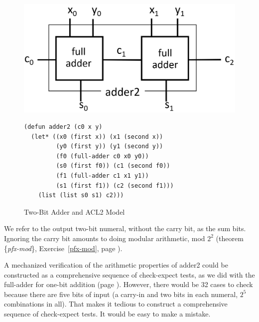 \begin{figure}
\begin{center}
\includegraphics[scale=0.25]{Images/adder2.png}
\begin{Verbatim}
(defun adder2 (c0 x y)
  (let* ((x0 (first x)) (x1 (second x))
         (y0 (first y)) (y1 (second y))
         (f0 (full-adder c0 x0 y0))
         (s0 (first f0)) (c1 (second f0))
         (f1 (full-adder c1 x1 y1))
         (s1 (first f1)) (c2 (second f1)))
    (list (list s0 s1) c2)))
\end{Verbatim}
\end{center}
\caption{Two-Bit Adder and ACL2 Model}
\label{fig:adder2}
\end{figure}

We refer to the output two-bit numeral, without the carry bit,
as the sum bits.
Ignoring the carry bit amounts to doing modular arithmetic, mod $2^2$
(theorem \{\emph{pfx-mod}\}, Exercise~\ref{pfx-mod}, page \pageref{pfx-mod}).

A mechanized verification of the arithmetic properties of \textsf{adder2}
could be constructed as a comprehensive sequence of \textsf{check-expect} tests,
as we did with the \textsf{full-adder} for one-bit addition
(page \pageref{full-adder-model-check}).
However, there would be 32 cases to check
because there are five bits of input
(a carry-in and two bits in each numeral, $2^5$ combinations in all).
That makes it tedious to construct a comprehensive sequence of \textsf{check-expect} tests.
It would be easy to make a mistake.

